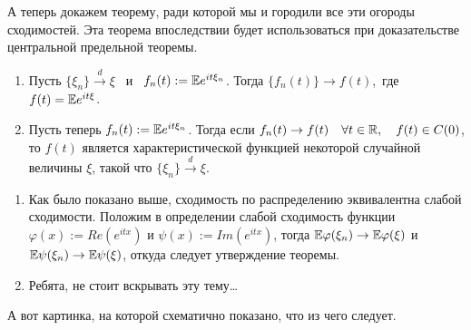 \documentclass[../TV&MS.tex]{subfiles}
\begin{document}
	А теперь докажем теорему, ради которой мы и городили все эти огороды сходимостей. 
	Эта теорема впоследствии будет использоваться при доказательстве центральной 
	предельной теоремы.

\begin{Th}

\begin{enumerate}
	\item Пусть $\{ \xi_n \} \xrightarrow{d} \xi$ \ и \ $f_n(t) := \mathbb{E} e^{it\xi_n}$.
	Тогда $\{ f_n(t) \} \rightarrow f(t)$,\ где $f(t) = \mathbb{E} e^{it\xi}$.
	
	\item Пусть теперь $f_n(t) := \mathbb{E} e^{it\xi_n}$. Тогда если $f_n(t) \rightarrow 
	f(t) \quad \forall t \in \mathbb{R}, \quad f(t) \in C(0)$, то $f(t)$ является 
	характеристической функцией некоторой случайной величины $\xi$, такой что 
	$\{ \xi_n \} \xrightarrow{d} \xi.$ 
\end{enumerate}
\end{Th}

\begin{Proof}
\begin{enumerate}
	\item Как было показано выше, сходимость по распределению эквивалентна слабой 
	сходимости. Положим в определении слабой сходимость функции $\varphi(x) := 
	Re(e^{itx})$ и $\psi(x) := Im(e^{itx})$, тогда $\mathbb{E}\varphi(\xi_n) \rightarrow 
	\mathbb{E}\varphi(\xi)$ и $\mathbb{E}\psi(\xi_n) \rightarrow \mathbb{E}\psi(\xi)$, откуда 
	следует утверждение теоремы.
	
	\item Ребята, не стоит вскрывать эту тему\ldots
\end{enumerate}
\end{Proof}

\begin{Wtf}
	А вот картинка, на которой схематично показано, что из чего следует.
\end{Wtf}

\begin{center}
\end{center}
\end{document}
